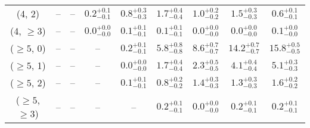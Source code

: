 \begin{table}[h!]
{\begin{tabular}{ccccccccc}
	(4, 2) & -- & -- & $0.2^{+ 0.1 }_{- 0.1 }$ & $0.8^{+ 0.3 }_{- 0.3 }$ & $1.7^{+ 0.4 }_{- 0.4 }$ & $1.0^{+ 0.2 }_{- 0.2 }$ & $1.5^{+ 0.3 }_{- 0.3 }$ & $0.6^{+ 0.1 }_{- 0.1 }$ \\[0.5ex] 
	(4, $\ge3$) & -- & -- & $0.0^{+ 0.0 }_{- 0.0 }$ & $0.1^{+ 0.1 }_{- 0.1 }$ & $0.1^{+ 0.1 }_{- 0.1 }$ & $0.0^{+ 0.0 }_{- 0.0 }$ & $0.0^{+ 0.0 }_{- 0.0 }$ & $0.1^{+ 0.0 }_{- 0.0 }$ \\[0.5ex] 
	($\ge5$, 0) & -- & -- & -- & $0.2^{+ 0.1 }_{- 0.1 }$ & $5.8^{+ 0.8 }_{- 0.8 }$ & $8.6^{+ 0.7 }_{- 0.7 }$ & $14.2^{+ 0.7 }_{- 0.7 }$ & $15.8^{+ 0.5 }_{- 0.5 }$ \\[0.5ex] 
	($\ge5$, 1) & -- & -- & -- & $0.0^{+ 0.0 }_{- 0.0 }$ & $1.7^{+ 0.4 }_{- 0.4 }$ & $2.3^{+ 0.5 }_{- 0.5 }$ & $4.1^{+ 0.4 }_{- 0.4 }$ & $5.1^{+ 0.3 }_{- 0.3 }$ \\[0.5ex] 
	($\ge5$, 2) & -- & -- & -- & $0.1^{+ 0.1 }_{- 0.1 }$ & $0.8^{+ 0.2 }_{- 0.2 }$ & $1.4^{+ 0.3 }_{- 0.3 }$ & $1.3^{+ 0.3 }_{- 0.3 }$ & $1.6^{+ 0.2 }_{- 0.2 }$ \\[0.5ex] 
	($\ge5$, $\ge3$) & -- & -- & -- & -- & $0.2^{+ 0.1 }_{- 0.1 }$ & $0.0^{+ 0.0 }_{- 0.0 }$ & $0.2^{+ 0.1 }_{- 0.1 }$ & $0.2^{+ 0.1 }_{- 0.1 }$ \\[0.5ex] 
	\hline
	\hline
\end{tabular}}
\end{table}
